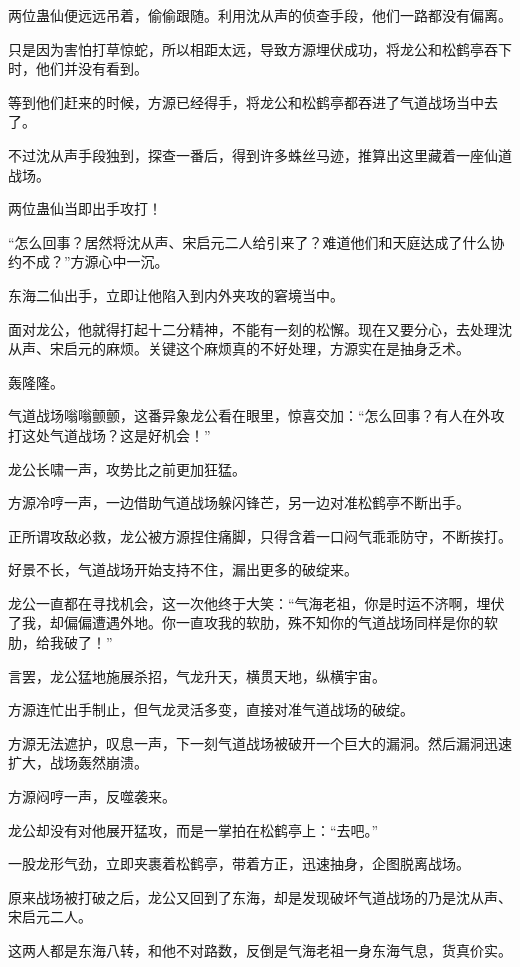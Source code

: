 \begin{this_body}
两位蛊仙便远远吊着，偷偷跟随。利用沈从声的侦查手段，他们一路都没有偏离。

只是因为害怕打草惊蛇，所以相距太远，导致方源埋伏成功，将龙公和松鹤亭吞下时，他们并没有看到。

等到他们赶来的时候，方源已经得手，将龙公和松鹤亭都吞进了气道战场当中去了。

不过沈从声手段独到，探查一番后，得到许多蛛丝马迹，推算出这里藏着一座仙道战场。

两位蛊仙当即出手攻打！

“怎么回事？居然将沈从声、宋启元二人给引来了？难道他们和天庭达成了什么协约不成？”方源心中一沉。

东海二仙出手，立即让他陷入到内外夹攻的窘境当中。

面对龙公，他就得打起十二分精神，不能有一刻的松懈。现在又要分心，去处理沈从声、宋启元的麻烦。关键这个麻烦真的不好处理，方源实在是抽身乏术。

轰隆隆。

气道战场嗡嗡颤颤，这番异象龙公看在眼里，惊喜交加：“怎么回事？有人在外攻打这处气道战场？这是好机会！”

龙公长啸一声，攻势比之前更加狂猛。

方源冷哼一声，一边借助气道战场躲闪锋芒，另一边对准松鹤亭不断出手。

正所谓攻敌必救，龙公被方源捏住痛脚，只得含着一口闷气乖乖防守，不断挨打。

好景不长，气道战场开始支持不住，漏出更多的破绽来。

龙公一直都在寻找机会，这一次他终于大笑：“气海老祖，你是时运不济啊，埋伏了我，却偏偏遭遇外地。你一直攻我的软肋，殊不知你的气道战场同样是你的软肋，给我破了！”

言罢，龙公猛地施展杀招，气龙升天，横贯天地，纵横宇宙。

方源连忙出手制止，但气龙灵活多变，直接对准气道战场的破绽。

方源无法遮护，叹息一声，下一刻气道战场被破开一个巨大的漏洞。然后漏洞迅速扩大，战场轰然崩溃。

方源闷哼一声，反噬袭来。

龙公却没有对他展开猛攻，而是一掌拍在松鹤亭上：“去吧。”

一股龙形气劲，立即夹裹着松鹤亭，带着方正，迅速抽身，企图脱离战场。

原来战场被打破之后，龙公又回到了东海，却是发现破坏气道战场的乃是沈从声、宋启元二人。

这两人都是东海八转，和他不对路数，反倒是气海老祖一身东海气息，货真价实。


\end{this_body}
